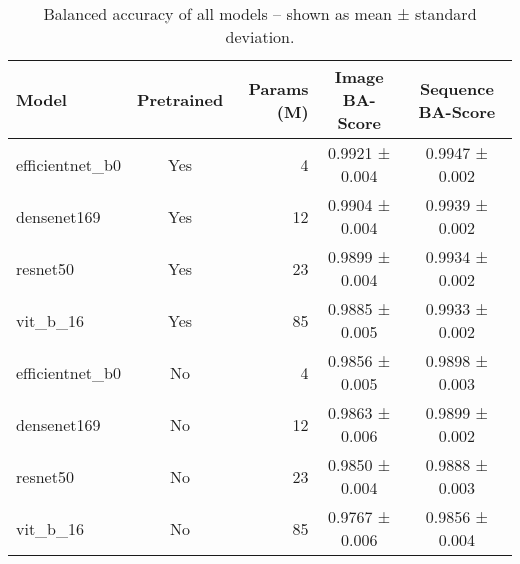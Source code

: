 \begin{table}[H]
\caption{Balanced accuracy of all models -- shown as mean ± standard deviation.}
\label{tab:bal_acc_by_model}
\begin{tabular}{l c r c c}
\toprule
Model & Pretrained & Params (M) & Image BA-Score & Sequence BA-Score \\
\midrule
efficientnet\_b0 & Yes & 4 & 0.9921 ± 0.004 & 0.9947 ± 0.002 \\
densenet169 & Yes & 12 & 0.9904 ± 0.004 & 0.9939 ± 0.002 \\
resnet50 & Yes & 23 & 0.9899 ± 0.004 & 0.9934 ± 0.002 \\
vit\_b\_16 & Yes & 85 & 0.9885 ± 0.005 & 0.9933 ± 0.002 \\
\midrule
efficientnet\_b0 & No & 4 & 0.9856 ± 0.005 & 0.9898 ± 0.003 \\
densenet169 & No & 12 & 0.9863 ± 0.006 & 0.9899 ± 0.002 \\
resnet50 & No & 23 & 0.9850 ± 0.004 & 0.9888 ± 0.003 \\
vit\_b\_16 & No & 85 & 0.9767 ± 0.006 & 0.9856 ± 0.004 \\
\bottomrule
\end{tabular}
\end{table}